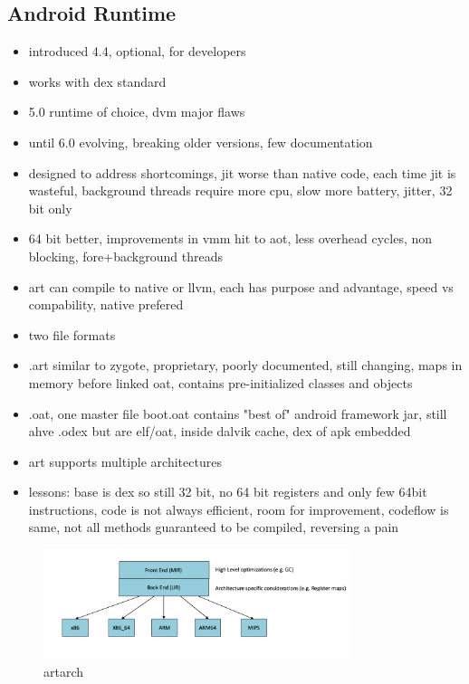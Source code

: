 \subsection{Android Runtime} \label{subsection:android-art}
\begin{itemize}
  \item introduced 4.4, optional, for developers
  \item works with dex standard
  \item 5.0 runtime of choice, dvm major flaws
  \item until 6.0 evolving, breaking older versions, few documentation
  \item designed to address shortcomings, jit worse than native code, each time jit is wasteful, background threads require more cpu, slow more battery, jitter, 32 bit only
  \item 64 bit better, improvements in vmm hit to aot, less overhead cycles, non blocking, fore+background threads
  \item art can compile to native or llvm, each has purpose and advantage, speed vs compability, native prefered
  \item two file formats
  \item .art similar to zygote, proprietary, poorly documented, still changing, maps in memory before linked oat, contains pre-initialized classes and objects
  \item .oat, one master file boot.oat contains "best of" android framework jar, still ahve .odex but are elf/oat, inside dalvik cache, dex of apk embedded
  \item art supports multiple architectures
  \item lessons: base is dex so still 32 bit, no 64 bit registers and only few 64bit instructions, code is not always efficient, room for improvement, codeflow is same, not all methods guaranteed to be compiled, reversing a pain
\end{itemize}

\begin{figure}[h]
    \centering
    \includegraphics[width=0.8\textwidth]{data/artarch.png}
    \caption{artarch}
    \label{fig:artarch}
\end{figure}

